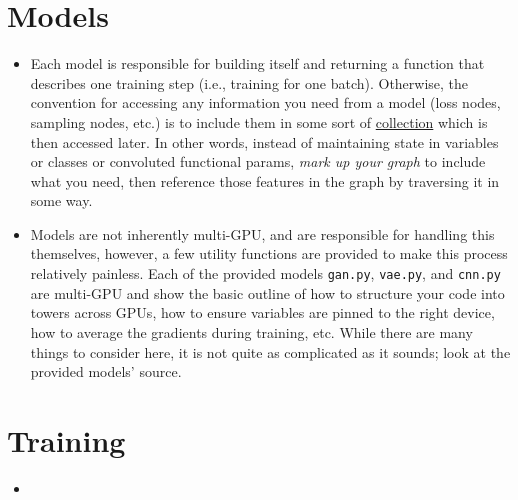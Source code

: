 \documentclass{article}
\begin{document}
\begin{flushleft}
  \section{Models}
  \begin{itemize}
  \item Each model is responsible for building itself and returning a function that describes one training step (i.e., training for one batch). Otherwise, the convention for accessing any information you need from a model (loss nodes, sampling nodes, etc.) is to include them in some sort of \href{https://www.tensorflow.org/versions/r0.12/api_docs/python/framework/graph_collections}{collection} which is then accessed later. In other words, instead of maintaining state in variables or classes or convoluted functional params, \emph{mark up your graph} to include what you need, then reference those features in the graph by traversing it in some way.
  \item Models are not inherently multi-GPU, and are responsible for handling this themselves, however, a few utility functions are provided to make this process relatively painless. Each of the provided models \texttt{gan.py}, \texttt{vae.py}, and \texttt{cnn.py} are multi-GPU and show the basic outline of how to structure your code into towers across GPUs, how to ensure variables are pinned to the right device, how to average the gradients during training, etc. While there are many things to consider here, it is not quite as complicated as it sounds; look at the provided models' source.
  \end{itemize}  


  \section{Training}
  \begin{itemize}
  \item 
  \end{itemize}
  


\end{flushleft}
\end{document}
